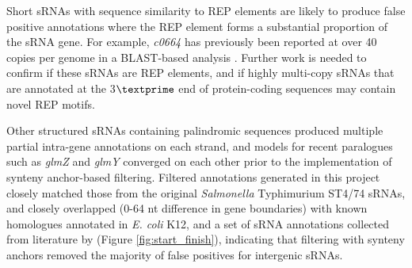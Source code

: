 Short sRNAs with sequence similarity to REP elements are likely to produce false positive annotations where the REP element forms a substantial proportion of the sRNA gene. For example, \textit{c0664} has previously been reported at over 40 copies per genome in a BLAST-based analysis \citep{Skippington2012-iv}. Further work is needed to confirm if these sRNAs are REP elements, and if highly multi-copy sRNAs that are annotated at the 3$\textprime$ end of protein-coding sequences may contain novel REP motifs. 

Other structured sRNAs containing palindromic sequences produced multiple partial intra-gene annotations on each strand, and models for recent paralogues such as \textit{glmZ} and \textit{glmY} converged on each other prior to the implementation of synteny anchor-based filtering. Filtered annotations generated in this project closely matched those from the original \textit{Salmonella} Typhimurium ST4/74 sRNAs, and closely overlapped (0-64 nt difference in gene boundaries) with known homologues annotated in \textit{E. coli} K12, and a set of sRNA annotations collected from literature by \cite{Richter2012-uuuuiu} (Figure \ref{fig:start_finish}), indicating that filtering with synteny anchors removed the majority of false positives for intergenic sRNAs.


